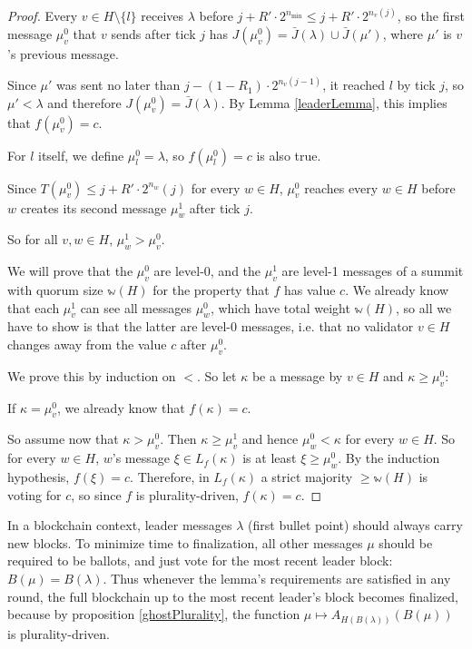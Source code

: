\documentclass[12pt, fleqn]{article}
\newcommand{\ww}{\mathbb{w}}
\begin{document}
\begin{proof}
  Every $v \in H \setminus \{l\}$ receives $\lambda$ before $j + R' \cdot 2^{n_{\min}} \leq j + R' \cdot 2^{n_v(j)}$, so the first message $\mu^0_v$ that $v$ sends after tick $j$ has $J(\mu^0_v) = \bar{J}(\lambda) \cup \bar{J}(\mu')$, where $\mu'$ is $v$'s previous message.

  Since $\mu'$ was sent no later than $j - (1 - R_1) \cdot 2^{n_v(j - 1)}$, it reached $l$ by tick $j$, so $\mu' < \lambda$ and therefore $J(\mu^0_v) = \bar{J}(\lambda)$. By Lemma \ref{leaderLemma}, this implies that $f(\mu^0_v) = c$.

  For $l$ itself, we define $\mu^0_l = \lambda$, so $f(\mu^0_l) = c$ is also true.

  Since $T(\mu^0_v) \leq j + R' \cdot 2^{n_w}(j)$ for every $w \in H$, $\mu^0_v$ reaches every $w \in H$ before $w$ creates its second message $\mu^1_w$ after tick $j$.

  So for all $v, w \in H$, $\mu^1_w > \mu^0_v$.

  We will prove that the $\mu^0_v$ are level-0, and the $\mu^1_v$ are level-1 messages of a summit with quorum size $\ww(H)$ for the property that $f$ has value $c$. We already know that each $\mu^1_v$ can see all messages $\mu^0_w$, which have total weight $\ww(H)$, so all we have to show is that the latter are level-0 messages, i.e. that no validator $v \in H$ changes away from the value $c$ after $\mu^0_v$.

  We prove this by induction on $<$. So let $\kappa$ be a message by $v \in H$ and $\kappa \geq \mu^0_v$:

  If $\kappa = \mu^0_v$, we already know that $f(\kappa) = c$.

  So assume now that $\kappa > \mu^0_v$. Then $\kappa \geq \mu^1_v$ and hence $\mu^0_w < \kappa$ for every $w \in H$. So for every $w \in H$, $w$'s message $\xi \in L_f(\kappa)$ is at least $\xi \geq \mu^0_w$. By the induction hypothesis, $f(\xi) = c$. Therefore, in $L_f(\kappa)$ a strict majority $\geq \ww(H)$ is voting for $c$, so since $f$ is plurality-driven, $f(\kappa) = c$.
\end{proof}

In a blockchain context, leader messages $\lambda$ (first bullet point) should always carry new blocks. To minimize time to finalization, all other messages $\mu$ should be required to be ballots, and just vote for the most recent leader block: $B(\mu) = B(\lambda)$. Thus whenever the lemma's requirements are satisfied in any round, the full blockchain up to the most recent leader's block becomes finalized, because by proposition \ref{ghostPlurality}, the function $\mu \mapsto A_{H(B(\lambda))}(B(\mu))$ is plurality-driven.
\end{document}
